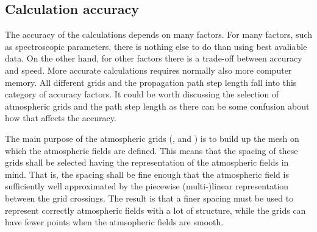 


\subsection{Calculation accuracy}
\label{sec:fm_defs:accuracy}

The accuracy of the calculations depends on many factors. For many
factors, such as spectroscopic parameters, there is nothing else to do
than using best avaliable data. On the other hand, for other factors
there is a trade-off between accuracy and speed. More accurate
calculations requires normally also more computer memory. All
different grids and the propagation path step length fall into this
category of accuracy factors. It could be worth discussing the
selection of atmospheric grids and the path step length as there can
be some confusion about how that affects the accuracy.

The main purpose of the atmospheric grids (,
 and ) is to build up the
mesh on which the atmospheric fields are defined. This means that the
spacing of these grids shall be selected having the representation of
the atmospheric fields in mind. That is, the spacing shall be fine
enough that the atmospheric field is sufficiently well approximated by
the piecewise (multi-)linear representation between the grid
crossings. The result is that a finer spacing must be used to
represent correctly atmospheric fields with a lot of structure, while
the grids can have fewer points when the atmsopheric fields are
smooth. 

